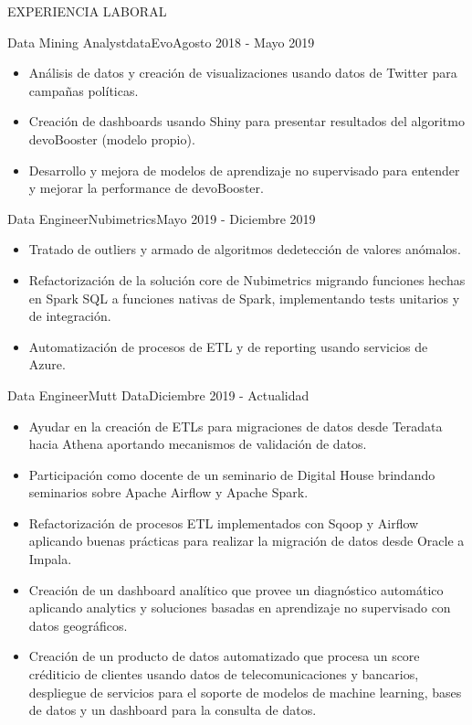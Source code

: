 \documentclass[]{mcdowellcv}
\begin{document}
\makeheader

\begin{cvsection}{EXPERIENCIA LABORAL}
	\begin{cvsubsection}{Data Mining Analyst}{dataEvo}{Agosto 2018 - Mayo 2019}
		\begin{itemize}
			\item Análisis de datos y creación de visualizaciones usando datos de Twitter para campañas políticas.
			\item Creación de dashboards usando Shiny para presentar resultados del algoritmo devoBooster (modelo propio).
			\item Desarrollo y mejora de modelos de aprendizaje no supervisado para entender y mejorar la performance de devoBooster.
		\end{itemize}
	\end{cvsubsection}
	
	\begin{cvsubsection}{Data Engineer}{Nubimetrics}{Mayo 2019 - Diciembre 2019}
		\begin{itemize}
			\item Tratado de outliers y armado de algoritmos dedetección de valores anómalos.
			\item Refactorización de la solución core de Nubimetrics migrando funciones hechas en Spark SQL a funciones nativas de Spark, implementando tests unitarios y de integración.
			\item Automatización de procesos de ETL y de reporting usando servicios de Azure.
		\end{itemize}
	\end{cvsubsection}
	
	\begin{cvsubsection}{Data Engineer}{Mutt Data}{Diciembre 2019 - Actualidad}
		\begin{itemize}
			\item Ayudar en la creación de ETLs para migraciones de datos desde Teradata hacia Athena aportando mecanismos de validación de datos.
			\item Participación como docente de un seminario de Digital House brindando seminarios sobre Apache Airflow y Apache Spark.
			\item Refactorización de procesos ETL implementados con Sqoop y Airflow aplicando buenas prácticas para realizar la migración de datos desde Oracle a Impala.
			\item Creación de un dashboard analítico que provee un diagnóstico automático aplicando analytics y soluciones basadas en aprendizaje no supervisado con datos geográficos.
			\item Creación de un producto de datos automatizado que procesa un score créditicio de clientes usando datos de telecomunicaciones y bancarios, despliegue de servicios para el soporte de modelos de machine learning, bases de datos y un dashboard para la consulta de datos.
		\end{itemize}
	\end{cvsubsection}
	

\end{cvsection}
\end{document}
